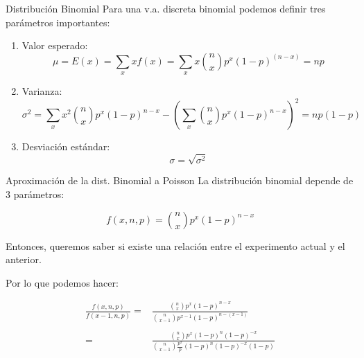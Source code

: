 \documentclass{beamer}
\begin{document}
\begin{frame}{Distribución Binomial}
  Para una v.a. discreta binomial podemos definir tres parámetros importantes:

  \begin{enumerate}
    \item Valor esperado:
    \begin{equation}
      \mu = E(x) = \sum_{x}^{} x f(x) = \sum_{x}^{} x \binom{n}{x} p^x (1-p)^(n-x) = np
    \end{equation}

    \item Varianza:
    \begin{equation}
      \sigma^2 = \sum_{x} x^2 \binom{n}{x} p^x (1-p)^{n-x} - (\sum_{x} \binom{n}{x} p^x (1-p)^{n-x})^2 = np(1-p)
    \end{equation}

    \item Desviación estándar:
    \begin{equation}
      \sigma = \sqrt{\sigma^2}
    \end{equation}

  \end{enumerate}

\end{frame}


\begin{frame}{Aproximación de la dist. Binomial a Poisson}
  La distribución binomial depende de 3 parámetros:

  \begin{equation}
    f(x,n,p) = \binom{n}{x} p^x (1-p)^{n-x}
  \end{equation}

Entonces, queremos saber si existe una relación entre el experimento actual y el
anterior.

Por lo que podemos hacer:

\begin{equation}
  \begin{array}{rr}
  \frac{f(x,n,p)}{f(x-1,n,p)} = & \frac{\binom{n}{x} p^x (1-p)^{n-x}}{\binom{n}{x-1} p^{x-1} (1-p)^{n-(x-1)}} \\
  \\

                              = & \frac{\binom{n}{x} p^x (1-p)^{n} (1-p)^{-x}}{\binom{n}{x-1} \frac{p^x}{p} (1-p)^{n}(1-p)^{-x} (1-p)}
  \end{array}
\end{equation}

\end{frame}
\end{document}
